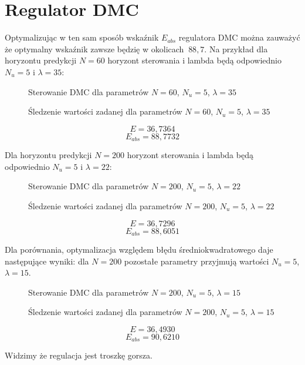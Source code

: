 \section{Regulator DMC}

Optymalizując w ten sam sposób wskaźnik $E_{abs}$ regulatora DMC można zauważyć że optymalny wskaźnik zawsze będzię w okolicach $~88,7$. Na przykład dla horyzontu predykcji $N=60$ horyzont sterowania i lambda będą odpowiednio $N_u=5$ i $\lambda=35$:

\begin{figure}[H]
\centering

\caption{Sterowanie DMC dla parametrów $N=60$, $N_u=5$,  $\lambda=35$}
\end{figure}

\begin{figure}[H]
\centering

\caption{Śledzenie wartości zadanej dla parametrów $N=60$, $N_u=5$,  $\lambda=35$}
\end{figure}

\begin{equation}
E = 36,7364
\end{equation}
\begin{equation}
E_{abs} = 88,7732
\end{equation}

Dla horyzontu predykcji $N=200$ horyzont sterowania i lambda będą odpowiednio $N_u=5$ i $\lambda=22$:

\begin{figure}[H]
\centering

\caption{Sterowanie DMC dla parametrów $N=200$, $N_u=5$,  $\lambda=22$}
\end{figure}

\begin{figure}[H]
\centering

\caption{Śledzenie wartości zadanej dla parametrów $N=200$, $N_u=5$,  $\lambda=22$}
\end{figure}

\begin{equation}
E = 36,7296
\end{equation}
\begin{equation}
E_{abs} = 88,6051
\end{equation}

Dla porównania, optymalizacja względem błędu średniokwadratowego daje następujące wyniki: dla $N=200$ pozostałe parametry przyjmują wartości $N_u=5$, $\lambda=15$.

\begin{figure}[H]
\centering

\caption{Sterowanie DMC dla parametrów $N=200$, $N_u=5$,  $\lambda=15$}
\end{figure}

\begin{figure}[H]
\centering

\caption{Śledzenie wartości zadanej dla parametrów $N=200$, $N_u=5$,  $\lambda=15$}
\end{figure}

\begin{equation}
E = 36,4930
\end{equation}
\begin{equation}
E_{abs} = 90,6210
\end{equation}

Widzimy że regulacja jest troszkę gorsza.